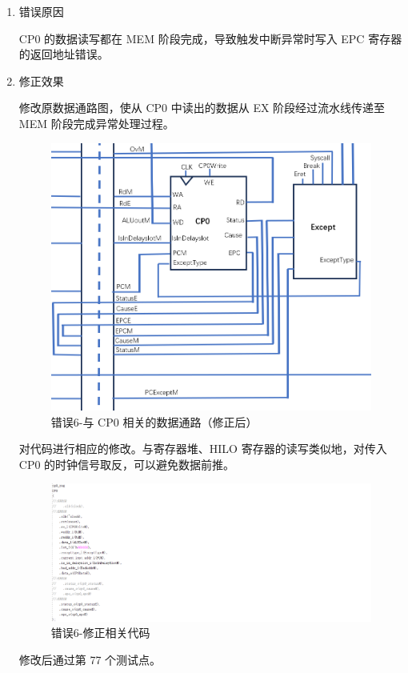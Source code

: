 \begin{enumerate}[(1)]
    \item 错误原因

CP0 的数据读写都在 MEM 阶段完成，导致触发中断异常时写入 EPC 寄存器的返回地址错误。
    
    \item 修正效果

修改原数据通路图，使从 CP0 中读出的数据从 EX 阶段经过流水线传递至 MEM 阶段完成异常处理过程。

\begin{figure}[H]
    \centering
    \includegraphics[width=\textwidth]{image/错误6-修正效果1.png}
    \caption{错误6-与 CP0 相关的数据通路（修正后）}
    \label{fig:错误6-修正效果1}
\end{figure}

对代码进行相应的修改。与寄存器堆、HILO 寄存器的读写类似地，对传入 CP0 的时钟信号取反，可以避免数据前推。

\begin{figure}[H]
    \centering
    \includegraphics[width=\textwidth]{image/错误6-修正效果2.png}
    \caption{错误6-修正相关代码}
    \label{fig:错误6-修正效果2}
\end{figure}

修改后通过第 77 个测试点。

\end{enumerate}


